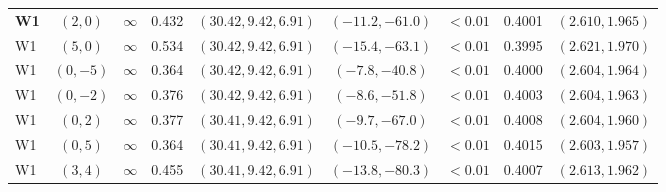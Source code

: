 \begin{table}[!htbp]
\begin{tabular}{@{}lccrccrrc@{}}
\textbf{W1} & \((2,0)\) & \(\infty\) & 0.432 & \((30.42,9.42,6.91)\) & \((-11.2,-61.0)\) & \(<0.01\) & 0.4001 & \((2.610,1.965)\) \\
W1 & \((5,0)\) & \(\infty\) & 0.534 & \((30.42,9.42,6.91)\) & \((-15.4,-63.1)\) & \(<0.01\) & 0.3995 & \((2.621,1.970)\) \\
W1 & \((0,-5)\) & \(\infty\) & 0.364 & \((30.42,9.42,6.91)\) & \((-7.8,-40.8)\) & \(<0.01\) & 0.4000 & \((2.604,1.964)\) \\
W1 & \((0,-2)\) & \(\infty\) & 0.376 & \((30.42,9.42,6.91)\) & \((-8.6,-51.8)\) & \(<0.01\) & 0.4003 & \((2.604,1.963)\) \\
W1 & \((0,2)\) & \(\infty\) & 0.377 & \((30.41,9.42,6.91)\) & \((-9.7,-67.0)\) & \(<0.01\) & 0.4008 & \((2.604,1.960)\) \\
W1 & \((0,5)\) & \(\infty\) & 0.364 & \((30.41,9.42,6.91)\) & \((-10.5,-78.2)\) & \(<0.01\) & 0.4015 & \((2.603,1.957)\) \\
W1 & \((3,4)\) & \(\infty\) & 0.455 & \((30.41,9.42,6.91)\) & \((-13.8,-80.3)\) & \(<0.01\) & 0.4007 & \((2.613,1.962)\) \\
\bottomrule
\end{tabular}
\end{table}
